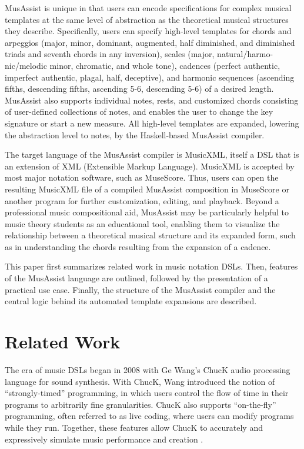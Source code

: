 \documentclass{article}
\begin{document}
MusAssist is unique in that users can encode specifications for complex musical templates at the same level of abstraction as the theoretical musical structures they describe. Specifically,  users can specify high-level templates for 
chords and arpeggios (major, minor, dominant, augmented, half diminished, and diminished triads and seventh chords in any inversion), 
scales (major, natural/harmo-nic/melodic minor, chromatic, and whole tone), 
cadences (perfect authentic, imperfect authentic, plagal, half, deceptive), and 
harmonic sequences (ascending fifths, descending fifths, ascending 5-6, descending 5-6) of a desired length. MusAssist also supports individual notes, rests, and customized chords consisting of user-defined collections of notes, and enables the user to change the key signature or start a new measure. All high-level templates are expanded, lowering the abstraction level to notes, by the Haskell-based MusAssist compiler.

The target language of the MusAssist compiler is MusicXML, itself a DSL that is an extension of XML (Extensible Markup Language). MusicXML is accepted by most major notation software, such as MuseScore. Thus, users can open the resulting MusicXML file of a compiled MusAssist composition in MuseScore or another program for further customization, editing, and playback. Beyond a professional music compositional aid, MusAssist may be particularly helpful to music theory students as an educational tool, enabling them to visualize the relationship between a theoretical musical structure and its expanded form, such as in understanding the chords resulting from the expansion of a cadence. 

This paper first summarizes related work in music notation DSLs. Then, features of the MusAssist language are outlined, followed by the presentation of a practical use case. Finally, the structure of the MusAssist compiler and the central logic behind its automated template expansions are described. 



\section{Related Work}\label{sec:related_work}

The era of music DSLs began in 2008 with Ge Wang’s ChucK audio processing language for sound synthesis. With ChucK, Wang introduced the notion of ``strongly-timed” programming, in which users control the flow of time in their programs to arbitrarily fine granularities. ChucK also supports ``on-the-fly” programming, often referred to as live coding, where users can modify programs while they run. Together, these features allow ChucK to accurately and expressively simulate music performance and creation \cite{wang_2008}. 
\end{document}
